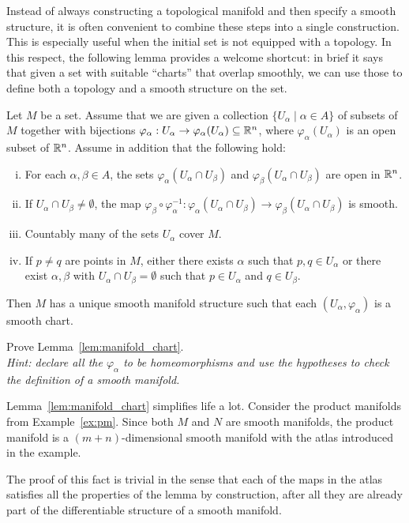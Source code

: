 Instead of always constructing a topological manifold and then specify a smooth structure, it is often convenient to combine these steps into a single construction.
This is especially useful when the initial set is not equipped with a topology.
In this respect, the following lemma provides a welcome shortcut: in brief it says that given a set with suitable ``charts'' that overlap smoothly, we can use those to define both a topology and a smooth structure on the set.

\begin{lemma}\label{lem:manifold_chart}
  Let $M$ be a set. Assume that we are given a collection $\{U_\alpha\mid \alpha\in A\}$ of subsets of $M$ together with bijections $\varphi_\alpha: U_\alpha\to\varphi_\alpha(U_\alpha)\subseteq\mathbb{R}^n$, where $\varphi_\alpha(U_\alpha)$ is an open subset of $\mathbb{R}^n$. Assume in addition that the following hold:
  \begin{enumerate}[(i)]
    \item For each $\alpha, \beta \in A$, the sets $\varphi_\alpha(U_\alpha \cap U_\beta)$ and $\varphi_\beta(U_\alpha \cap U_\beta)$ are open in $\mathbb{R}^n$.
    \item If $U_\alpha \cap U_\beta \neq \emptyset$, the map $\varphi_\beta\circ\varphi_\alpha^{-1}: \varphi_\alpha(U_\alpha \cap U_\beta)\to \varphi_\beta(U_\alpha \cap U_\beta)$ is smooth.
    \item Countably many of the sets $U_\alpha$ cover $M$.
    \item If $p\neq q$ are points in $M$, either there exists $\alpha$ such that $p,q\in U_\alpha$ or there exist $\alpha,\beta$ with $U_\alpha\cap U_\beta=\emptyset$ such that $p\in U_\alpha$ and $q\in U_\beta$.
  \end{enumerate}
  Then $M$ has a unique smooth manifold structure such that each $(U_\alpha,\varphi_\alpha)$ is a smooth chart.
\end{lemma}
\begin{exercise}
  Prove Lemma~\ref{lem:manifold_chart}.\\
  \textit{\small Hint: declare all the $\varphi_\alpha$ to be homeomorphisms and use the hypotheses to check the definition of a smooth manifold.}
\end{exercise}

\begin{example}
  Lemma~\ref{lem:manifold_chart} simplifies life a lot.
  Consider the product manifolds from Example~\ref{ex:pm}.
  Since both $M$ and $N$ are smooth manifolds, the product manifold is a $(m+n)$-dimensional smooth manifold with the atlas introduced in the example.

  The proof of this fact is trivial in the sense that each of the maps in the atlas satisfies all the properties of the lemma by construction, after all they are already part of the differentiable structure of a smooth manifold.
\end{example}

